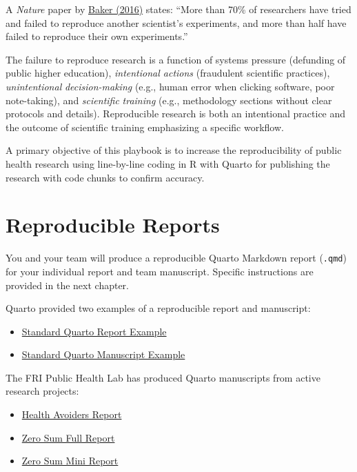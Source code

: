 \documentclass[
  english,
  letterpaper,
  DIV=11,
  numbers=noendperiod]{scrreprt}
\begin{document}
A \emph{Nature} paper by
\href{https://www.nature.com/articles/533452a}{Baker (2016)} states:
``More than 70\% of researchers have tried and failed to reproduce
another scientist's experiments, and more than half have failed to
reproduce their own experiments.''

The failure to reproduce research is a function of systems pressure
(defunding of public higher education), \emph{intentional actions}
(fraudulent scientific practices), \emph{unintentional}
\emph{decision-making} (e.g., human error when clicking software, poor
note-taking), and \emph{scientific} \emph{training} (e.g., methodology
sections without clear protocols and details). Reproducible research is
both an intentional practice and the outcome of scientific training
emphasizing a specific workflow.

A primary objective of this playbook is to increase the reproducibility
of public health research using line-by-line coding in R with Quarto for
publishing the research with code chunks to confirm accuracy.

\chapter{Reproducible Reports}\label{reproducible-reports}

You and your team will produce a reproducible Quarto Markdown report
(\texttt{.qmd}) for your individual report and team manuscript. Specific
instructions are provided in the next chapter.

Quarto provided two examples of a reproducible report and manuscript:

\begin{itemize}
\item
  \href{https://quarto-dev.github.io/quarto-gallery/page-layout/tufte.html}{Standard
  Quarto Report Example}
\item
  \href{https://quarto-ext.github.io/manuscript-template-jupyter/}{Standard
  Quarto Manuscript Example}
\end{itemize}

The FRI Public Health Lab has produced Quarto manuscripts from active
research projects:

\begin{itemize}
\item
  \href{https://zihanhei.quarto.pub/avoider-report/}{Health Avoiders
  Report}
\item
  \href{https://fripublichealth.quarto.pub/zerosum/}{Zero Sum Full
  Report}
\item
  \href{https://fripublichealth.quarto.pub/zerosum/example-preview.html}{Zero
  Sum Mini Report}
\end{itemize}
\end{document}

